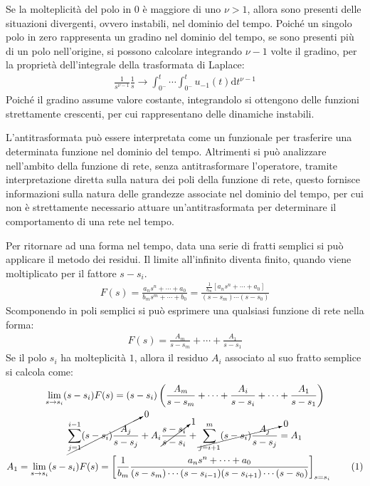 \documentclass{article}
\newcommand{\df}{\mathrm{d}}
\newcommand{\tageq}{\tag{\stepcounter{equation}\theequation}}
\numberwithin{equation}{subsection}
\begin{document}
Se la molteplicità del polo in $0$ è maggiore di uno $\nu>1$, allora sono presenti delle situazioni divergenti, ovvero instabili, nel dominio del tempo. Poiché un singolo 
polo in zero rappresenta un gradino nel dominio del tempo, se sono presenti più di un polo nell'origine, si possono calcolare integrando $\nu-1$ volte il gradino, per la 
proprietà dell'integrale della trasformata di Laplace:
\begin{gather*}
    \displaystyle\frac{1}{s^{\nu-1}}\frac{1}{s}\to\int_{0^-}^t\cdots\int_{0^-}^tu_{-1}(t)\df t^{\nu-1}
\end{gather*}
Poiché il gradino assume valore costante, integrandolo si ottengono delle funzioni strettamente crescenti, per cui rappresentano delle dinamiche instabili. 


L'antitrasformata può essere interpretata come un funzionale per trasferire una determinata funzione nel dominio del tempo. Altrimenti si può analizzare nell'ambito della 
funzione di rete, senza antitrasformare l'operatore, tramite interpretazione diretta sulla natura dei poli della funzione di rete, questo fornisce informazioni sulla 
natura delle grandezze associate nel dominio del tempo, per cui non è strettamente necessario attuare un'antitrasformata per determinare il comportamento di una rete 
nel tempo. 

Per ritornare ad una forma nel tempo, data una serie di fratti semplici si può applicare il metodo dei residui. 
Il limite all'infinito diventa finito, quando viene moltiplicato per il fattore $s-s_i$. %
\begin{gather*}
    F(s)=\displaystyle\frac{a_ns^n+\cdots+a_0}{b_ms^m+\cdots+b_0}=\frac{\displaystyle\frac{1}{b_m}\left[a_ns^n+\cdots+a_0\right]}{(s-s_m)\cdots(s-s_0)}
\end{gather*}
Scomponendo in poli semplici si può esprimere una qualsiasi funzione di rete nella forma:
\begin{gather*}
    F(s)=\displaystyle\frac{A_m}{s-s_m}+\cdots+\frac{A_1}{s-s_1}
\end{gather*}
Se il polo $s_i$ ha molteplicità $1$, allora il residuo $A_i$ associato al suo fratto semplice si calcola come:
\begin{gather*}
    \lim_{s\to s_i}(s-s_i)F(s)=(s-s_i)\left(\displaystyle\frac{A_m}{s-s_m}+\cdots+\frac{A_i}{s-s_i}+\cdots+\frac{A_1}{s-s_1}\right)\\
    \displaystyle\cancelto{0}{\sum_{j=1}^{i-1}(s-s_i)\frac{A_j}{s-s_j}}+A_i\cancelto{1}{\frac{s-s_i}{s-s_i}}+\cancelto{0}{\sum_{j=i+1}^{m}(s-s_i)\frac{A_j}{s-s_j}}=A_1\\
    A_1=\lim_{s\to s_i}(s-s_i)F(s)=\left[\displaystyle\frac{1}{b_m}\frac{a_ns^n+\cdots+a_0}{(s-s_m)\cdots(s-s_{i-1})(s-s_{i+1})\cdots(s-s_0)}\right]_{s=s_i}\tageq
\end{gather*}
\end{document}
